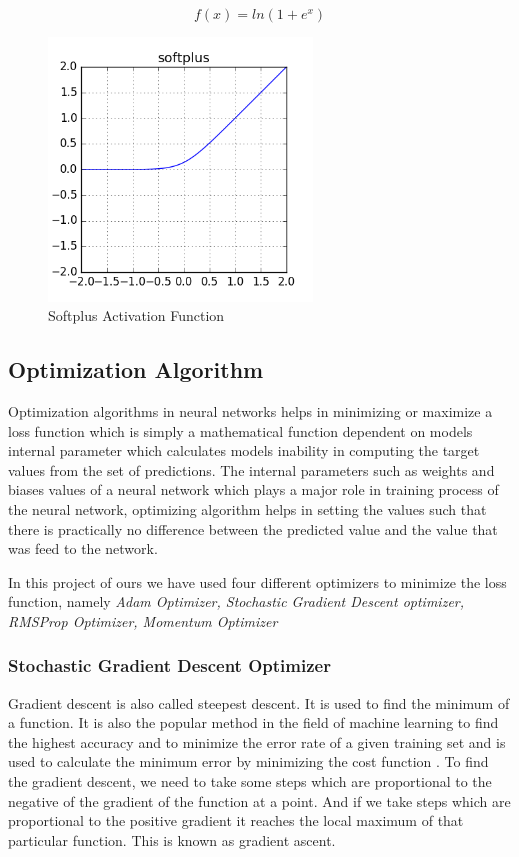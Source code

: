 \documentclass[12pt, a4paper]{report}
\begin{document}
\begin{equation}\label{eq:softplus}
	f(x) = ln(1+e^{x})
\end{equation}
\begin{figure}[h]
	\centering
	\includegraphics[width=7cm]{activation-softplus.png}
	\caption{Softplus Activation Function}
	\label{fig:softplus}
\end{figure}



\subsection{Optimization Algorithm}\label{optimizer}

Optimization algorithms in neural networks helps in minimizing or maximize a loss function which is simply a mathematical function dependent on models internal parameter which calculates models inability in computing the target values from the set of predictions. The internal parameters such as weights and biases values of a neural network which plays a major role in training process of the neural network, optimizing algorithm helps in setting the values such that there is practically no difference between the predicted value and the value that was feed to the network.\\ \par

In this project of ours we have used four different optimizers to minimize the loss function, namely \textit{Adam Optimizer, Stochastic Gradient Descent optimizer, RMSProp Optimizer, Momentum Optimizer}

\subsubsection{Stochastic Gradient Descent Optimizer}\label{sgd}
Gradient descent is also called steepest descent. It is used to find the minimum of a function. It is also the popular method in the field of machine learning to find the highest accuracy and to minimize the error rate of a given training set and is used to calculate the minimum error by minimizing the cost function . To find the gradient descent, we need to take some steps which are proportional to the negative of the gradient of the function at a point. And if we take steps which are proportional to the positive gradient it reaches the local maximum of that particular function. This is known as gradient ascent\cite{OptimizerGeneral}.\\ \par
\end{document}
